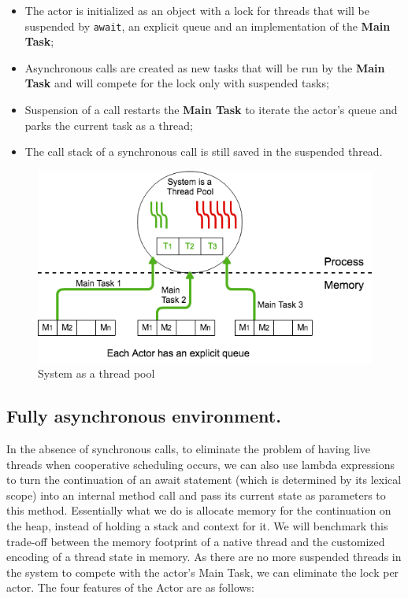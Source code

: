 \begin{itemize}
	\item The actor is initialized as an object with a lock for threads that will be suspended by \texttt{await}, an explicit queue and an implementation of the \textbf{Main Task};
	\item Asynchronous calls are created as new tasks that will be run by the \textbf{Main Task} and will compete for the lock only with suspended tasks;
	\item Suspension of a call restarts the \textbf{Main Task} to iterate the actor's queue and parks the current task as a thread;
	\item The call stack of a synchronous call is still saved in the suspended thread.
\end{itemize}





\begin{figure}
	\centering
	\includegraphics[scale=0.51]{stp.png}
	\caption{System as a thread pool}
	\label{stp}
	
\end{figure}

\subsection{Fully asynchronous environment.}
In the absence of synchronous calls, to eliminate the problem of having live threads when cooperative scheduling occurs, we can also use lambda expressions to turn the continuation of an await statement (which is determined by its lexical scope) into an internal method call and pass its current state as parameters to this method. Essentially what we do is allocate memory for the continuation on the heap, instead of holding a stack and context for it. We will benchmark this trade-off between the memory footprint of a native thread and the customized encoding of a thread state in memory. As there are no more suspended threads in the system to compete with the actor's Main Task, we can eliminate the lock per actor. The four features of the Actor are as follows:

